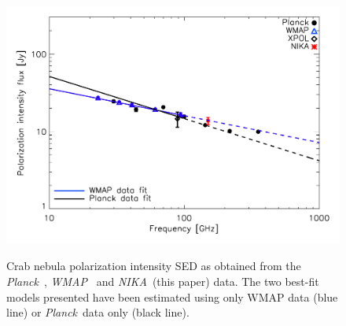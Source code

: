 \documentclass[twocolumn,traditabstract]{aa}
\def\NIKA{\textit{NIKA}}
\def\Planck{\textit{Planck}}
\def\WMAP{\textit{WMAP}}
\begin{document}
\begin{figure}
  \centering
             { \includegraphics[width=1\linewidth,keepaspectratio]{figures/Crab_SED_ipol.pdf}}
           \caption{Crab nebula polarization intensity SED as obtained from the \Planck\ \citep{2015arXiv150702058P}, \WMAP\ \citep{2011ApJS..192...19W} and \NIKA\ (this paper) data. The two best-fit models presented have been estimated using only WMAP data (blue line) or \Planck\ data only (black line).}
\label{crab_SED_ipol}		
  \end{figure} 
 \noindent


\end{document}
